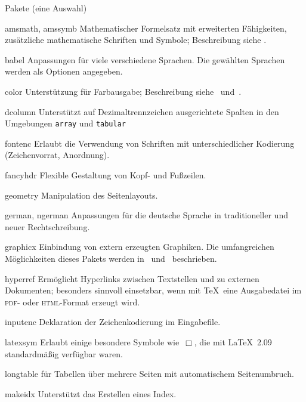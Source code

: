 \begin{table}[htbp]
\caption{Pakete (eine Auswahl)}\label{pack}
\begin{lminipage}{11cm}
\begin{ttdescription}%
\setlength{\itemsep}{.5\itemsep plus1pt minus1pt}
\item[amsmath, amssymb] Mathematischer Formelsatz mit erweiterten Fähigkeiten,
  zusätzliche mathematische Schriften und Symbole; Beschreibung siehe
  \cite{ch8}.
\item[babel] Anpassungen für viele verschiedene Sprachen. Die
  gewählten Sprachen werden als Optionen angegeben.
\item[color] Unterstützung für Farbausgabe;
  Beschreibung  siehe~\cite{grfguide} und~\cite{grfcomp}.
\item[dcolumn] Unterstützt auf Dezimaltrennzeichen ausgerichtete
  Spalten in den Umgebungen \texttt{array} und \texttt{tabular}
\item[fontenc] Erlaubt die Verwendung von Schriften mit
  unterschiedlicher Kodierung (Zeichenvorrat, Anordnung).
\item[fancyhdr] Flexible Gestaltung von Kopf- und Fußzeilen.
\item[geometry] Manipulation des Seitenlayouts.
\item[german, ngerman] Anpassungen für die deutsche Sprache in
  traditioneller und neuer Rechtschreibung.
\item[graphicx] Einbindung von extern erzeugten Graphiken.
  Die umfangreichen Möglichkeiten dieses Pakets werden 
  in~\cite{grfguide} und~\cite{grfcomp} beschrieben.
\item[hyperref] Ermöglicht Hyperlinks zwischen Textstellen und zu
  externen Dokumenten; besonders sinnvoll einsetzbar, 
  wenn mit \TeX\ eine Ausgabedatei im \textsc{pdf}- oder \textsc{html}-Format 
  erzeugt wird.
\item[inputenc] Deklaration der Zeichenkodierung im
  Eingabefile.
\item[latexsym] Erlaubt einige besondere Symbole wie~\(\Box\),
  die mit \LaTeX~2.09 standardmäßig verfügbar waren.
\item[longtable]
  für Tabellen über mehrere Seiten mit automatischem Seitenumbruch.
\item[makeidx] Unterstützt das Erstellen eines Index.

\end{ttdescription}
\end{lminipage}
\end{table}
